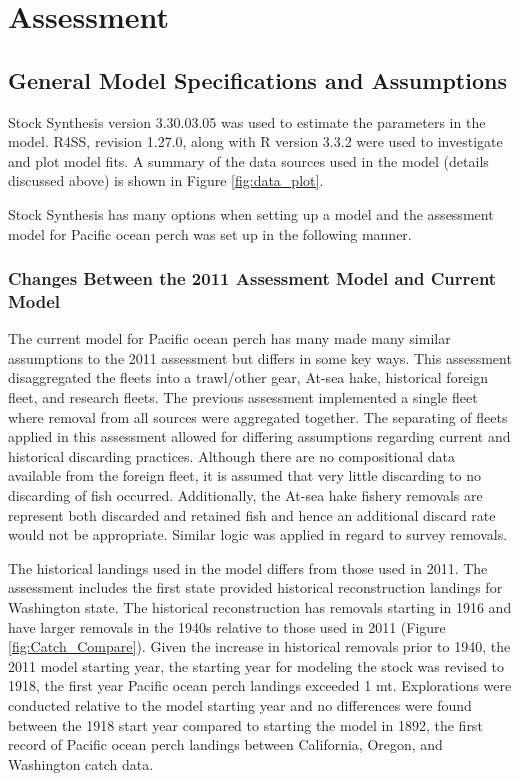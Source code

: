 \documentclass[12pt,]{article}
\begin{document}
\section{Assessment}\label{assessment}

\subsection{General Model Specifications and
Assumptions}\label{general-model-specifications-and-assumptions}

Stock Synthesis version 3.30.03.05 was used to estimate the parameters
in the model. R4SS, revision 1.27.0, along with R version 3.3.2 were
used to investigate and plot model fits. A summary of the data sources
used in the model (details discussed above) is shown in Figure
\ref{fig:data_plot}.

Stock Synthesis has many options when setting up a model and the
assessment model for Pacific ocean perch was set up in the following
manner.

\subsubsection{Changes Between the 2011 Assessment Model and Current
Model}\label{changes-between-the-2011-assessment-model-and-current-model}

The current model for Pacific ocean perch has many made many similar
assumptions to the 2011 assessment but differs in some key ways. This
assessment disaggregated the fleets into a trawl/other gear, At-sea
hake, historical foreign fleet, and research fleets. The previous
assessment implemented a single fleet where removal from all sources
were aggregated together. The separating of fleets applied in this
assessment allowed for differing assumptions regarding current and
historical discarding practices. Although there are no compositional
data available from the foreign fleet, it is assumed that very little
discarding to no discarding of fish occurred. Additionally, the At-sea
hake fishery removals are represent both discarded and retained fish and
hence an additional discard rate would not be appropriate. Similar logic
was applied in regard to survey removals.

The historical landings used in the model differs from those used in
2011. The assessment includes the first state provided historical
reconstruction landings for Washington state. The historical
reconstruction has removals starting in 1916 and have larger removals in
the 1940s relative to those used in 2011 (Figure
\ref{fig:Catch_Compare}). Given the increase in historical removals
prior to 1940, the 2011 model starting year, the starting year for
modeling the stock was revised to 1918, the first year Pacific ocean
perch landings exceeded 1 mt. Explorations were conducted relative to
the model starting year and no differences were found between the 1918
start year compared to starting the model in 1892, the first record of
Pacific ocean perch landings between California, Oregon, and Washington
catch data.
\end{document}
